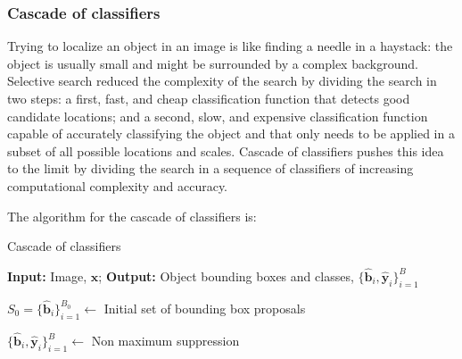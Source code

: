 

\subsubsection{Cascade of classifiers}
Trying to localize an object in an image is like finding a needle in a haystack: the object is usually small and might be surrounded by a complex background. 
Selective search reduced the complexity of the search by dividing the search in two steps: a first, fast, and cheap classification function that detects good candidate locations; and a second, slow, and expensive classification function capable of accurately classifying the object and that only needs to be applied in a subset of all possible locations and scales. Cascade of classifiers pushes this idea to the limit by dividing the search in a sequence of classifiers of increasing computational complexity and accuracy. 


The algorithm for the cascade of classifiers is:

\begin{algorithm}[h]
\SetAlgoVlined
\DontPrintSemicolon
{}
\caption{Cascade of classifiers}
\faketablecaption{}
\label{alg:cascade_classifier}
{\bf Input:} Image, $\mathbf{x}$;
{\bf Output:} Object bounding boxes and classes, $\{\hat{\mathbf{b}}_i, \hat{\mathbf{y}}_i\}_{i=1}^B$\;

$S_0 = \{\hat{\mathbf{b}}_i\}_{i=1}^{B_0} \leftarrow$ Initial set of bounding box proposals\;

$\{\hat{\mathbf{b}}_i, \hat{\mathbf{y}}_i\}_{i=1}^B \leftarrow$ Non maximum suppression\;
\end{algorithm}

